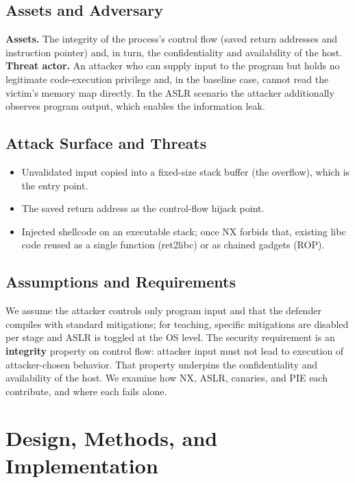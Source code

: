 \documentclass[10pt,twocolumn,letterpaper]{article}
\begin{document}
\subsection{Assets and Adversary}
\textbf{Assets.} The integrity of the process's control flow (saved return
addresses and instruction pointer) and, in turn, the confidentiality and
availability of the host. \textbf{Threat actor.} An attacker who can supply
input to the program but holds no legitimate code-execution privilege and, in
the baseline case, cannot read the victim's memory map directly. In the ASLR
scenario the attacker additionally observes program output, which enables the
information leak.

\subsection{Attack Surface and Threats}
\begin{itemize}
  \item Unvalidated input copied into a fixed-size stack buffer (the
    overflow), which is the entry point.
  \item The saved return address as the control-flow hijack point.
  \item Injected shellcode on an executable stack; once NX forbids that,
    existing libc code reused as a single function (ret2libc) or as chained
    gadgets (ROP).
\end{itemize}

\subsection{Assumptions and Requirements}
We assume the attacker controls only program input and that the defender
compiles with standard mitigations; for teaching, specific mitigations are
disabled per stage and ASLR is toggled at the OS level. The security
requirement is an \textbf{integrity} property on control flow: attacker input
must not lead to execution of attacker-chosen behavior. That property underpins
the confidentiality and availability of the host. We examine how NX, ASLR, canaries,
and PIE each contribute, and where each fails alone.

\section{Design, Methods, and Implementation}
\end{document}
